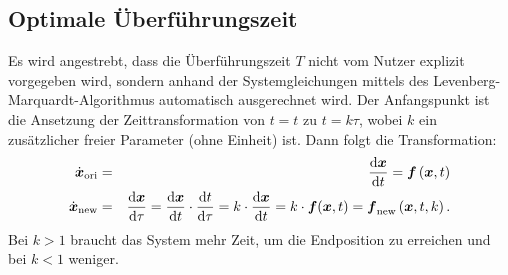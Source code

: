 \subsection{Optimale Überführungszeit}
\label{Optimale_Überführungszeit}
Es wird angestrebt, dass die Überführungszeit $T$ nicht vom Nutzer explizit vorgegeben wird, sondern anhand der Systemgleichungen mittels des Levenberg-Marquardt-Algorithmus automatisch ausgerechnet wird. Der Anfangspunkt ist die Ansetzung der Zeittransformation von $t = t$ zu $t = k\tau$, wobei $k$ ein zusätzlicher freier Parameter (ohne Einheit) ist. Dann folgt die Transformation:
\begin{eqnarray}
\dot{\vect{x}}_{\mathrm{ori}} &=& \frac{\mathrm{d} \vect{x}}{\mathrm{d} t} = \vect{f}\left ( \vect{x},t \right )\notag\\ %
\dot{\vect{x}}_{\mathrm{new}} &=& \frac{\mathrm{d} \vect{x}}{\mathrm{d} \tau} = \frac{\mathrm{d} \vect{x}}{\mathrm{d} t}\cdot \frac{\mathrm{d} t}{\mathrm{d} \tau} = k\cdot \frac{\mathrm{d} \vect{x}}{\mathrm{d} t} = k\cdot \vect{f}(\vect{x},t) = \vect{f}_{\mathrm{new}}\left ( \vect{x},t,k \right ).\label{eq:mit_k}
\end{eqnarray}
Bei $k>1$ braucht das System mehr Zeit, um die Endposition zu erreichen und bei $k<1$ weniger. 

